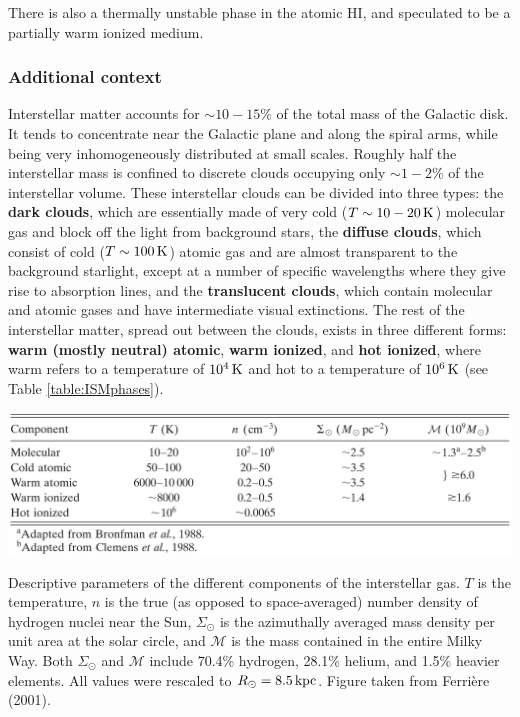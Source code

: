 \documentclass[a4paper,10pt]{article}
\begin{document}
{\noindent}There is also a thermally unstable phase in the atomic HI, and speculated to be a partially warm ionized medium.

\subsubsection{Additional context}

Interstellar matter accounts for $\sim10-15\%$ of the total
mass of the Galactic disk. It tends to concentrate near the Galactic plane and along the spiral arms, while being very inhomogeneously distributed at small scales. Roughly half the interstellar mass is confined to discrete clouds occupying only $\sim1-2\%$ of the interstellar volume. These interstellar clouds can be divided into three types: the \textbf{dark clouds}, which are essentially made of very cold ($T\sim10-20\,{\rm K}$) molecular gas and block off the light from background stars, the \textbf{diffuse clouds}, which consist of cold ($T\sim100\,{\rm K}$) atomic gas and are almost transparent to the background starlight, except at a number of specific wavelengths where they give rise to absorption lines, and the \textbf{translucent clouds}, which contain molecular and atomic gases and have intermediate visual extinctions. The rest of the interstellar matter, spread out between the clouds, exists in three different forms: \textbf{warm (mostly neutral) atomic}, \textbf{warm ionized}, and \textbf{hot ionized}, where warm refers to a temperature of $10^4\,{\rm K}$ and hot to a temperature of $10^6\,{\rm K}$ (see Table \ref{table:ISMphases}).

\begin{table}[h]
    \centering
    \includegraphics[width=14cm]{figures/ISMphases_table.png}
    \caption{\footnotesize{Descriptive parameters of the different components of the interstellar gas. $T$ is the temperature, $n$ is the true (as opposed to space-averaged) number density of hydrogen nuclei near the Sun, $\Sigma_\odot$ is the azimuthally averaged mass density per unit area at the solar circle, and $\mathcal{M}$ is the mass contained in the entire Milky Way. Both $\Sigma_\odot$ and $\mathcal{M}$ include 70.4\% hydrogen, 28.1\% helium, and 1.5\% heavier elements. All values were rescaled to $R_\odot=8.5\,{\rm kpc}$. Figure taken from Ferri\`ere (2001).}}
    \label{table:ISMphases}
\end{table}
\end{document}
